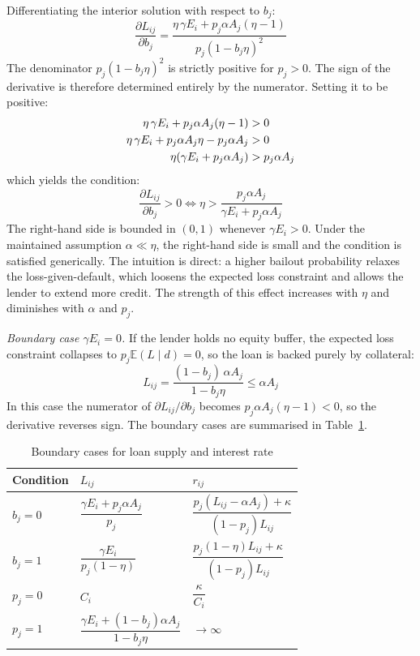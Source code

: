 \documentclass{article}
\begin{document}
Differentiating the interior solution with respect to $b_j$:
\begin{equation}
    \frac{\partial L_{ij}}{\partial b_{j}}
    = \frac{\eta\,\gamma E_{i} + p_{j}\alpha A_{j}(\eta - 1)}{p_{j}(1 - b_{j}\eta)^{2}}
\end{equation}
The denominator $p_j(1-b_j\eta)^2$ is strictly positive for $p_j > 0$. The sign of
the derivative is therefore determined entirely by the numerator. Setting it to be
positive:
\begin{align}
    \eta\,\gamma E_{i} + p_{j}\alpha A_{j}(\eta - 1) &> 0 \notag \\
    \eta\,\gamma E_{i} + p_{j}\alpha A_{j}\eta - p_{j}\alpha A_{j} &> 0 \notag \\
    \eta(\gamma E_{i} + p_{j}\alpha A_{j}) &> p_{j}\alpha A_{j}
\end{align}
which yields the condition:
\begin{equation}
\boxed{
    \frac{\partial L_{ij}}{\partial b_{j}} > 0
    \iff
    \eta > \frac{p_{j}\alpha A_{j}}{\gamma E_{i} + p_{j}\alpha A_{j}}
}
\end{equation}
The right-hand side is bounded in $(0,1)$ whenever $\gamma E_i > 0$. Under the
maintained assumption $\alpha \ll \eta$, the right-hand side is small and the condition
is satisfied generically. The intuition is direct: a higher bailout probability relaxes
the loss-given-default, which loosens the expected loss constraint and allows the lender
to extend more credit. The strength of this effect increases with $\eta$ and diminishes
with $\alpha$ and $p_j$.

\medskip
\noindent\textit{Boundary case $\gamma E_i = 0$.} If the lender holds no equity buffer,
the expected loss constraint collapses to $p_j \mathbb{E}(L \mid d) = 0$, so the
loan is backed purely by collateral:
\begin{equation}
    L_{ij} = \frac{(1 - b_{j})\,\alpha A_{j}}{1 - b_{j}\eta} \leq \alpha A_{j}
\end{equation}
In this case the numerator of $\partial L_{ij}/\partial b_j$ becomes
$p_j \alpha A_j (\eta - 1) < 0$, so the derivative reverses sign. The boundary
cases are summarised in Table~\ref{tab:boundary}.

\begin{table}[h]
\centering
\caption{Boundary cases for loan supply and interest rate}
\label{tab:boundary}
\begin{tabular}{lll}
\toprule
Condition & $L_{ij}$ & $r_{ij}$ \\
\midrule
$b_j = 0$ & $\dfrac{\gamma E_i + p_j \alpha A_j}{p_j}$ & $\dfrac{p_j(L_{ij} - \alpha A_j) + \kappa}{(1-p_j)L_{ij}}$ \\[10pt]
$b_j = 1$ & $\dfrac{\gamma E_i}{p_j(1-\eta)}$ & $\dfrac{p_j(1-\eta)L_{ij} + \kappa}{(1-p_j)L_{ij}}$ \\[10pt]
$p_j = 0$ & $C_i$ & $\dfrac{\kappa}{C_i}$ \\[10pt]
$p_j = 1$ & $\dfrac{\gamma E_i + (1-b_j)\alpha A_j}{1 - b_j\eta}$ & $\to \infty$ \\
\bottomrule
\end{tabular}
\end{table}
\end{document}
